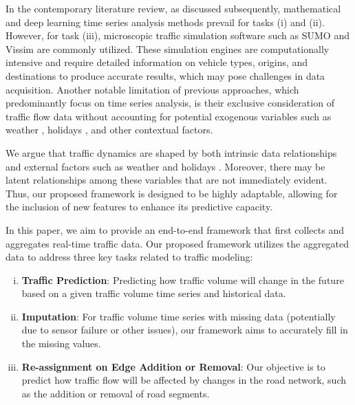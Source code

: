 In the contemporary literature review, as discussed subsequently, mathematical and deep learning time series analysis methods prevail for tasks (i) and (ii). However, for task (iii), microscopic traffic simulation software such as SUMO \cite{sumo} and Vissim \cite{vissim} are commonly utilized. These simulation engines are computationally intensive and require detailed information on vehicle types, origins, and destinations to produce accurate results, which may pose challenges in data acquisition. Another notable limitation of previous approaches, which predominantly focus on time series analysis, is their exclusive consideration of traffic flow data without accounting for potential exogenous variables such as weather \cite{weather}, holidays \cite{holiday}, and other contextual factors.

We argue that traffic dynamics are shaped by both intrinsic data relationships and external factors such as weather \cite{weather} and holidays \cite{holiday}. Moreover, there may be latent relationships among these variables that are not immediately evident. Thus, our proposed \name framework is designed to be highly adaptable, allowing for the inclusion of new features to enhance its predictive capacity.

In this paper, we aim to provide an end-to-end framework that first collects and aggregates real-time traffic data. Our proposed framework utilizes the aggregated data to address three key tasks related to traffic modeling:
\begin{enumerate}[(i)]
\item \textbf{Traffic Prediction}: Predicting how traffic volume will change in the future based on a given traffic volume time series and historical data.
\item \textbf{Imputation}: For traffic volume time series with missing data (potentially due to sensor failure or other issues), our framework aims to accurately fill in the missing values.
\item \textbf{Re-assignment on Edge Addition or Removal}: Our objective is to predict how traffic flow will be affected by changes in the road network, such as the addition or removal of road segments.
\end{enumerate}

